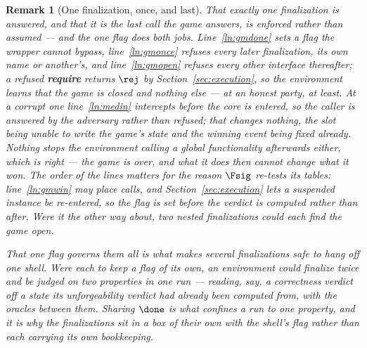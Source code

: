 \documentclass[10pt,oneside,openany]{book}
\theoremstyle{accentdef}
\newtheorem{remark}[definition]{Remark}
\theoremstyle{accentplain}
\begin{document}
\begin{remark}[One finalization, once, and last]\label{rem:gmonce}
That exactly one finalization is answered, and that it is the last call the game answers, is
enforced rather than assumed --- and the one flag does both jobs. Line~\ref{ln:gmdone} sets a flag
the wrapper cannot bypass, line~\ref{ln:gmonce} refuses every later finalization, its own name or
another's, and line~\ref{ln:gmopen} refuses every other interface thereafter; a refused
\textbf{require} returns $\rej$ by Section~\ref{sec:execution}, so the environment learns that the
game is closed and nothing else --- at an honest party, at least. At a corrupt one line~\ref{ln:medin}
intercepts before the core is entered, so the caller is answered by the adversary rather than refused;
that changes nothing, the slot being unable to write the game's state and the winning event being
fixed already.
Nothing stops the environment calling a global functionality afterwards either, which is
right --- the game is over, and what it does then cannot change what it won. The order of the lines
matters for the reason $\Fsig$ re-tests its tables: line~\ref{ln:gmwin} may place calls, and
Section~\ref{sec:execution} lets a suspended instance be re-entered, so the flag is set before the
verdict is computed rather than after. Were it the other way about, two nested finalizations
could each find the game open.

That one flag governs them all is what makes several finalizations safe to hang off one shell.
Were each to keep a flag of its own, an environment could finalize twice and be judged on two
properties in one run --- reading, say, a correctness verdict off a state its unforgeability
verdict had already been computed from, with the oracles between them. Sharing $\done$ is what
confines a run to one property, and it is why the finalizations sit in a box of their own with the
shell's flag rather than each carrying its own bookkeeping.
\end{remark}
\end{document}
